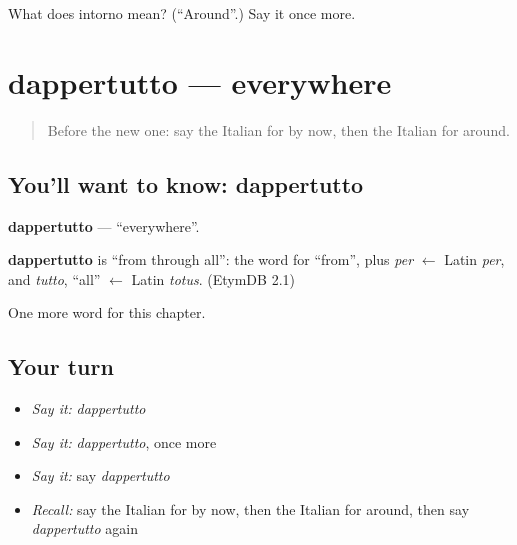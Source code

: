\begin{tcolorbox}[breakable,colback=teal!4,colframe=teal!35!black,title={Before you move on}]
What does intorno mean? (\textquotedblleft{}Around\textquotedblright{}.) Say it once more.
\end{tcolorbox}
\section[dappertutto]{dappertutto — everywhere}

\label{lesson:IT-C154-dappertutto}



\begin{quote}
Before the new one: say the Italian for by now, then the Italian for around.
\end{quote}

\subsection*{You'll want to know: dappertutto}
\textbf{dappertutto} — \textquotedblleft{}everywhere\textquotedblright{}.

\begin{cousinweb}
\textbf{dappertutto} is \textquotedblleft{}from through all\textquotedblright{}: the word for \textquotedblleft{}from\textquotedblright{}, plus \emph{per} $\leftarrow$ Latin \emph{per}, and \emph{tutto}, \textquotedblleft{}all\textquotedblright{} $\leftarrow$ Latin \emph{totus}. (EtymDB 2.1)
\end{cousinweb}

\begin{grammarlens}[title={What you've built}]
One more word for this chapter.
\end{grammarlens}

\subsection*{Your turn}
\begin{itemize}
\raggedright
  \item \emph{Say it:} \emph{dappertutto}
  \item \emph{Say it:} \emph{dappertutto}, once more
  \item \emph{Say it:} say \emph{dappertutto}
  \item \emph{Recall:} say the Italian for by now, then the Italian for around, then say \emph{dappertutto} again
\end{itemize}

